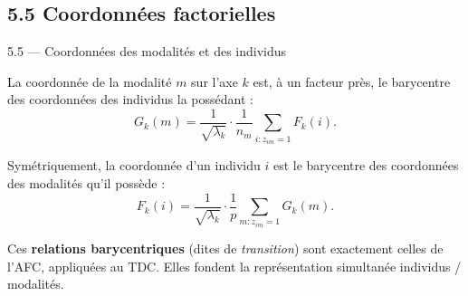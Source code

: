 \subsection{5.5 Coordonnées factorielles}
\begin{frame}{5.5 — Coordonnées des modalités et des individus}
\begin{theorem}
La coordonnée de la modalité $m$ sur l'axe $k$ est, à un facteur près,
le \alert{barycentre} des coordonnées des individus la possédant :
\[
G_k(m) = \frac{1}{\sqrt{\lambda_k}}
         \cdot \frac{1}{n_m} \sum_{i : z_{im}=1} F_k(i).
\]
\end{theorem}

\begin{theorem}
Symétriquement, la coordonnée d'un individu $i$ est le barycentre
des coordonnées des modalités qu'il possède :
\[
F_k(i) = \frac{1}{\sqrt{\lambda_k}}
         \cdot \frac{1}{p} \sum_{m : z_{im}=1} G_k(m).
\]
\end{theorem}

\begin{rema}
\small Ces \textbf{relations barycentriques} (dites de \emph{transition}) sont
exactement celles de l'AFC, appliquées au TDC. Elles fondent la
représentation simultanée individus / modalités.
\end{rema}
\end{frame}

